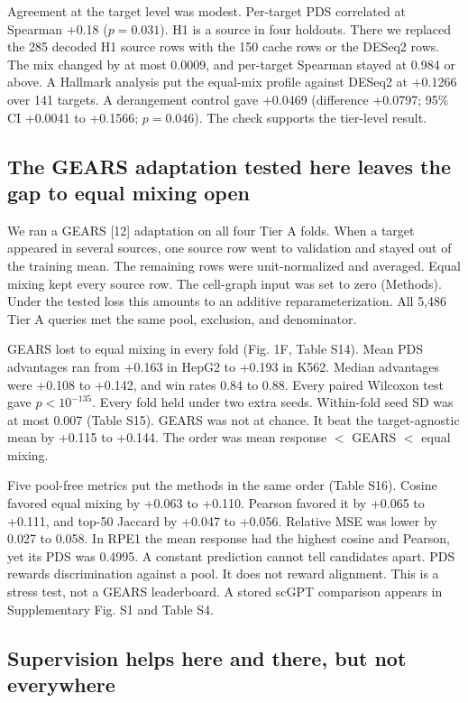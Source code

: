 \documentclass[12pt]{article}
\begin{document}
Agreement at the target level was modest. Per-target PDS correlated at Spearman +0.18 ($p = 0.031$). H1 is a source in four holdouts. There we replaced the 285 decoded H1 source rows with the 150 cache rows or the DESeq2 rows. The mix changed by at most 0.0009, and per-target Spearman stayed at 0.984 or above. A Hallmark analysis put the equal-mix profile against DESeq2 at +0.1266 over 141 targets. A derangement control gave +0.0469 (difference +0.0797; 95\% CI +0.0041 to +0.1566; $p = 0.046$). The check supports the tier-level result.

\subsection{The GEARS adaptation tested here leaves the gap to equal mixing open}

We ran a GEARS [12] adaptation on all four Tier A folds. When a target appeared in several sources, one source row went to validation and stayed out of the training mean. The remaining rows were unit-normalized and averaged. Equal mixing kept every source row. The cell-graph input was set to zero (Methods). Under the tested loss this amounts to an additive reparameterization. All 5,486 Tier A queries met the same pool, exclusion, and denominator.

GEARS lost to equal mixing in every fold (Fig. 1F, Table S14). Mean PDS advantages ran from +0.163 in HepG2 to +0.193 in K562. Median advantages were +0.108 to +0.142, and win rates 0.84 to 0.88. Every paired Wilcoxon test gave $p < 10^{-135}$. Every fold held under two extra seeds. Within-fold seed SD was at most 0.007 (Table S15). GEARS was not at chance. It beat the target-agnostic mean by +0.115 to +0.144. The order was mean response $<$ GEARS $<$ equal mixing.

Five pool-free metrics put the methods in the same order (Table S16). Cosine favored equal mixing by +0.063 to +0.110. Pearson favored it by +0.065 to +0.111, and top-50 Jaccard by +0.047 to +0.056. Relative MSE was lower by 0.027 to 0.058. In RPE1 the mean response had the highest cosine and Pearson, yet its PDS was 0.4995. A constant prediction cannot tell candidates apart. PDS rewards discrimination against a pool. It does not reward alignment. This is a stress test, not a GEARS leaderboard. A stored scGPT comparison appears in Supplementary Fig. S1 and Table S4.

\subsection{Supervision helps here and there, but not everywhere}
\end{document}
